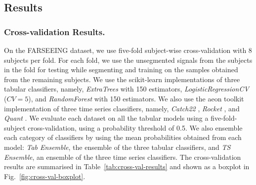 \documentclass[runningheads]{llncs}
\begin{document}
\subsection{Results}
\label{sec:results}
\subsubsection{Cross-validation Results.}
\label{sec:cross-validation}
On the FARSEEING dataset, we use five-fold subject-wise cross-validation with 8 subjects per fold. For each fold, we use the unsegmented signals from the subjects in the fold for testing while segmenting and training on the samples obtained from the remaining subjects. We use the scikit-learn implementations of three tabular classifiers, namely, \textit{ExtraTrees} with 150 estimators, \textit{LogisticRegressionCV} ($CV=5$), and \textit{RandomForest} with 150 estimators. We also use the aeon toolkit implementation of three time series classifiers, namely, \textit{Catch22} \cite{lubba2019catch22}, \textit{Rocket} \cite{dempster2020rocket}, and \textit{Quant} \cite{dempster2024quant}. We evaluate each dataset on all the tabular models using a five-fold-subject cross-validation, using a probability threshold of 0.5. We also ensemble each category of classifiers by using the mean probabilities obtained from each model: \textit{Tab Ensemble}, the ensemble of the three tabular classifiers, and \textit{TS Ensemble}, an ensemble of the three time series classifiers. The cross-validation results are summarised in Table~\ref{tab:cross-val-results} and shown as a boxplot in Fig.~\ref{fig:cross-val-boxplot}.
\end{document}
